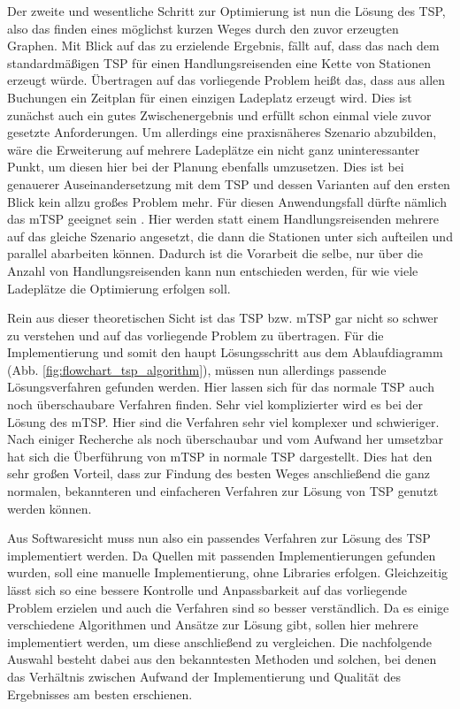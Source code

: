 Der zweite und wesentliche Schritt zur Optimierung ist nun die Lösung des TSP, also das finden eines möglichst kurzen Weges durch den zuvor erzeugten Graphen. Mit Blick auf das zu erzielende Ergebnis, fällt auf, dass das nach dem standardmäßigen TSP für einen Handlungsreisenden eine Kette von Stationen erzeugt würde. Übertragen auf das vorliegende Problem heißt das, dass aus allen Buchungen ein Zeitplan für einen einzigen Ladeplatz erzeugt wird. Dies ist zunächst auch ein gutes Zwischenergebnis und erfüllt schon einmal viele zuvor gesetzte Anforderungen. Um allerdings eine praxisnäheres Szenario abzubilden, wäre die Erweiterung auf mehrere Ladeplätze ein nicht ganz uninteressanter Punkt, um diesen hier bei der Planung ebenfalls umzusetzen. Dies ist bei genauerer Auseinandersetzung mit dem TSP und dessen Varianten auf den ersten Blick kein allzu großes Problem mehr. Für diesen Anwendungsfall dürfte nämlich das mTSP geeignet sein \cite{mtsp}. Hier werden statt einem Handlungsreisenden mehrere auf das gleiche Szenario angesetzt, die dann die Stationen unter sich aufteilen und parallel abarbeiten können. Dadurch ist die Vorarbeit die selbe, nur über die Anzahl von Handlungsreisenden kann nun entschieden werden, für wie viele Ladeplätze die Optimierung erfolgen soll.

Rein aus dieser theoretischen Sicht ist das TSP bzw. mTSP gar nicht so schwer zu verstehen und auf das vorliegende Problem zu übertragen. Für die Implementierung und somit den haupt Lösungsschritt aus dem Ablaufdiagramm (Abb. \ref{fig:flowchart_tsp_algorithm}), müssen nun allerdings passende Lösungsverfahren gefunden werden. Hier lassen sich für das normale TSP auch noch überschaubare Verfahren finden. Sehr viel komplizierter wird es bei der Lösung des mTSP. Hier sind die Verfahren sehr viel komplexer und schwieriger. Nach einiger Recherche als noch überschaubar und vom Aufwand her umsetzbar hat sich die Überführung von mTSP in normale TSP dargestellt. Dies hat den sehr großen Vorteil, dass zur Findung des besten Weges anschließend die ganz normalen, bekannteren und einfacheren Verfahren zur Lösung von TSP genutzt werden können. \cite{mtsp, mtspAlgosAndTransform}



Aus Softwaresicht muss nun also ein passendes Verfahren zur Lösung des TSP implementiert werden. Da Quellen mit passenden Implementierungen gefunden wurden, soll eine manuelle Implementierung, ohne Libraries erfolgen. Gleichzeitig lässt sich so eine bessere Kontrolle und Anpassbarkeit auf das vorliegende Problem erzielen und auch die Verfahren sind so besser verständlich.  Da es einige verschiedene Algorithmen und Ansätze zur Lösung gibt, sollen hier mehrere implementiert werden, um diese anschließend zu vergleichen. Die nachfolgende Auswahl besteht dabei aus den bekanntesten Methoden und solchen, bei denen das Verhältnis zwischen Aufwand der Implementierung und Qualität des Ergebnisses am besten erschienen.

